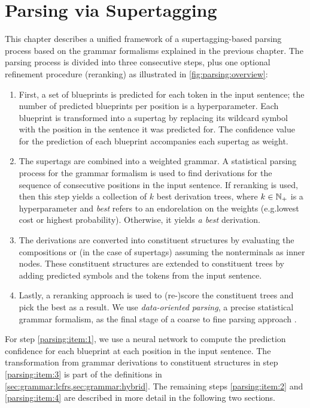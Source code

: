 \documentclass[../document.tex]{subfiles}
\begin{document}
    \chapter{Parsing via Supertagging}
    This chapter describes a unified framework of a supertagging-based parsing process based on the grammar formalisms explained in the previous chapter.
    The parsing process is divided into three consecutive steps, plus one optional refinement procedure (reranking) as illustrated in \cref{fig:parsing:overview}:
    \begin{enumerate}
        \item\label{parsing:item:1}
            First, a set of blueprints is predicted for each token in the input sentence; the number of predicted blueprints per position is a hyperparameter.
            Each blueprint is transformed into a supertag by replacing its wildcard symbol with the position in the sentence it was predicted for.
            The confidence value for the prediction of each blueprint accompanies each supertag as weight.
        \item\label{parsing:item:2}
            The supertags are combined into a weighted grammar.
            A statistical parsing process for the grammar formalism is used to find derivations for the sequence of consecutive positions in the input sentence.
            If reranking is used, then this step yields a collection of \(k\) best derivation trees, where \(k \in \mathbb{N}_+\) is a hyperparameter and \emph{best} refers to an endorelation on the weights (e.g.\@ lowest cost or highest probability).
            Otherwise, it yields \emph{a best} derivation.
        \item\label{parsing:item:3}
            The derivations are converted into constituent structures by evaluating the  compositions or (in the case of  supertags) assuming the nonterminals as inner nodes.
            These constituent structures are extended to constituent trees by adding predicted  symbols and the tokens from the input sentence.
        \item\label{parsing:item:4}
            Lastly, a reranking approach is used to (re-)score the constituent trees and pick the best as a result.
            We use \emph{data-oriented parsing}, a precise statistical grammar formalism, as the final stage of a coarse to fine parsing approach \citep{CraSchBod16}.
    \end{enumerate}
    For step \ref{parsing:item:1}, we use a neural network to compute the prediction confidence for each blueprint at each position in the input sentence.
    The transformation from grammar derivations to constituent structures in step \ref{parsing:item:3} is part of the definitions in \cref{sec:grammar:lcfrs,sec:grammar:hybrid}.
    The remaining steps \ref{parsing:item:2} and \ref{parsing:item:4} are described in more detail in the following two sections.
\end{document}
